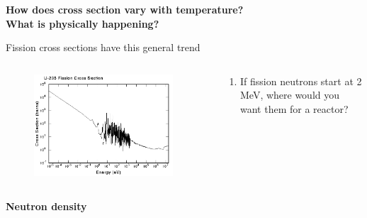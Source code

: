 \documentclass[aspectratio=1610,pdftex,dvipsnames,compress,xcolor={dvipsnames}]{beamer}
\begin{document}
\begin{frame}[plain]{}
    \centering\Large\textbf{How does cross section vary with temperature?}\\
    \centering\small\textbf{What is physically happening?}
\end{frame}


\addtocounter{framenumber}{-1} 
\begin{frame}{Fission cross sections have this general trend}
    \begin{columns}

        \begin{column}{0.60\textwidth}
            \begin{figure}
                \centering
                \includegraphics[width=0.95\textwidth]{u235.fission.cross.section.jpg}
            \end{figure}
        \end{column}

        \begin{column}{0.40\textwidth}
            \begin{enumerate}[series=outerlist,topsep=0pt,itemsep=21pt,leftmargin=*,label=(\arabic*)]
                \item[]If fission neutrons start at 2 MeV, where would you want them for a reactor?
            \end{enumerate}
        \end{column}

    \end{columns}
\end{frame}


\begin{frame}[plain]{}
    \centering\LARGE\textbf{Neutron density}
\end{frame}
\end{document}
